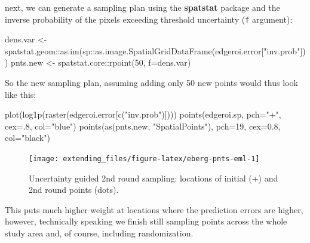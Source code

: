 \documentclass[
  graybox,natbib,nospthms]{svmono}
\newenvironment{Shaded}{\begin{snugshade}}{\end{snugshade}}
\newcommand{\AttributeTok}[1]{\textcolor[rgb]{0.61,0.61,0.61}{#1}}
\newcommand{\DecValTok}[1]{\textcolor[rgb]{0.06,0.06,0.06}{#1}}
\newcommand{\FloatTok}[1]{\textcolor[rgb]{0.06,0.06,0.06}{#1}}
\newcommand{\FunctionTok}[1]{\textcolor[rgb]{0,0,0}{#1}}
\newcommand{\NormalTok}[1]{#1}
\newcommand{\OtherTok}[1]{\textcolor[rgb]{0.37,0.37,0.37}{#1}}
\newcommand{\SpecialCharTok}[1]{\textcolor[rgb]{0,0,0}{#1}}
\newcommand{\StringTok}[1]{\textcolor[rgb]{0.5,0.5,0.5}{#1}}
\begin{document}
next, we can generate a sampling plan using the \textbf{spatstat} package and the inverse
probability of the pixels exceeding threshold uncertainty (\texttt{f} argument):

\begin{Shaded}
\begin{Highlighting}[]
\NormalTok{dens.var }\OtherTok{\textless{}{-}}\NormalTok{ spatstat.geom}\SpecialCharTok{::}\FunctionTok{as.im}\NormalTok{(sp}\SpecialCharTok{::}\FunctionTok{as.image.SpatialGridDataFrame}\NormalTok{(edgeroi.error[}\StringTok{"inv.prob"}\NormalTok{]))}
\NormalTok{pnts.new }\OtherTok{\textless{}{-}}\NormalTok{ spatstat.core}\SpecialCharTok{::}\FunctionTok{rpoint}\NormalTok{(}\DecValTok{50}\NormalTok{, }\AttributeTok{f=}\NormalTok{dens.var)}
\end{Highlighting}
\end{Shaded}

So the new sampling plan, assuming adding only 50 new points would thus look like this:

\begin{Shaded}
\begin{Highlighting}[]
\FunctionTok{plot}\NormalTok{(}\FunctionTok{log1p}\NormalTok{(}\FunctionTok{raster}\NormalTok{(edgeroi.error[}\FunctionTok{c}\NormalTok{(}\StringTok{"inv.prob"}\NormalTok{)])))}
\FunctionTok{points}\NormalTok{(edgeroi.sp, }\AttributeTok{pch=}\StringTok{"+"}\NormalTok{, }\AttributeTok{cex=}\NormalTok{.}\DecValTok{8}\NormalTok{, }\AttributeTok{col=}\StringTok{"blue"}\NormalTok{)}
\FunctionTok{points}\NormalTok{(}\FunctionTok{as}\NormalTok{(pnts.new, }\StringTok{"SpatialPoints"}\NormalTok{), }\AttributeTok{pch=}\DecValTok{19}\NormalTok{, }\AttributeTok{cex=}\FloatTok{0.8}\NormalTok{, }\AttributeTok{col=}\StringTok{"black"}\NormalTok{)}
\end{Highlighting}
\end{Shaded}

\begin{figure}

{\centering \texttt{[image: extending\_files/figure-latex/eberg-pnts-eml-1]} 

}

\caption{Uncertainty guided 2nd round sampling: locations of initial (+) and 2nd round points (dots).}\label{fig:eberg-pnts-eml}
\end{figure}

This puts much higher weight at locations where the prediction errors are higher,
however, technically speaking we finish still sampling points across the whole
study area and, of course, including randomization.
\end{document}
